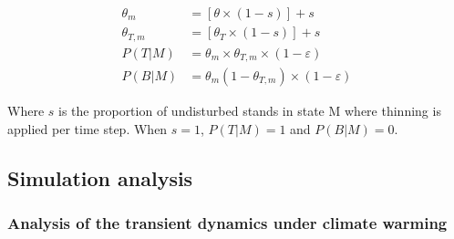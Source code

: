 \documentclass[12pt]{article}
\begin{document}
\[
\begin{aligned}
  \theta_{m} &= [\theta \times (1 - s)] + s \\
  \theta_{T, m} &= [\theta_{T} \times (1 - s)] + s \\[6pt]
  P(T|M) &= \theta_m \times \theta_{T,m} \times (1 - \varepsilon) \\
  P(B|M) &= \theta_m (1 - \theta_{T,m}) \times (1 - \varepsilon)
\end{aligned}
\]

Where \(s\) is the proportion of undisturbed stands in state M where
thinning is applied per time step. When \(s=1\), \(P(T|M) = 1\) and
\(P(B|M) = 0\).

\hypertarget{simulation-analysis}{%
\subsection{Simulation analysis}\label{simulation-analysis}}

\hypertarget{analysis-of-the-transient-dynamics-under-climate-warming}{%
\subsubsection{Analysis of the transient dynamics under climate
warming}\label{analysis-of-the-transient-dynamics-under-climate-warming}}
\end{document}
